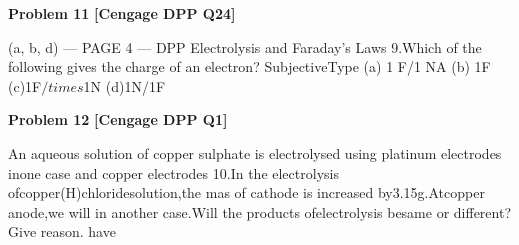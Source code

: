\begin{problembox}
\textbf{Problem 11} \hfill \textbf{[Cengage DPP Q24]}
\label{q:ext-cng_dpp_all_questions-11}

(a, b, d)
--- PAGE 4 ---
DPP
Electrolysis and Faraday's Laws
9.Which of the following gives the charge of an electron?
SubjectiveType
(a) 1 F/1 NA
(b) 1F
(c)1F$/times$1N
(d)1N/1F
\end{problembox}

\begin{problembox}
\textbf{Problem 12} \hfill \textbf{[Cengage DPP Q1]}
\label{q:ext-cng_dpp_all_questions-12}

An aqueous solution of copper sulphate is electrolysed
using platinum electrodes inone case and copper electrodes
10.In the electrolysis ofcopper(H)chloridesolution,the mas
of cathode is increased by3.15g.Atcopper anode,we will
in another case.Will the products ofelectrolysis besame
or different?Give reason.
have
\end{problembox}

